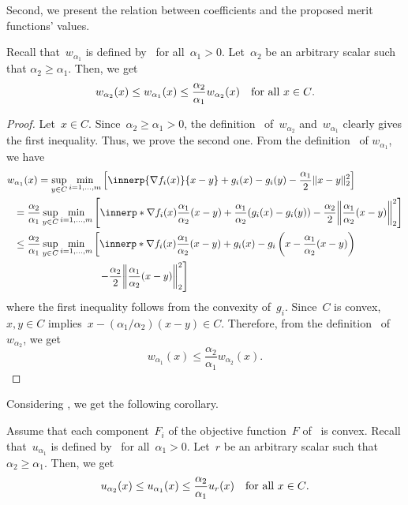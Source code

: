 \documentclass[../main]{subfiles}
\begin{document}
Second, we present the relation between coefficients and the proposed merit functions' values.
\begin{theorem} 
    Recall that~$w_{\alpha_1}$ is defined by~ for all~$\alpha_1 > 0$.
    Let~$\alpha_2$ be an arbitrary scalar such that $\alpha_2 \ge \alpha_1$.
    Then, we get
    \begin{equation}
        w_{\alpha_2}(x) \le w_{\alpha_1}(x) \le \frac{\alpha_2}{\alpha_1} w_{\alpha_2}(x) \quad \text{for all~$x \in C$}
    .\end{equation}
\end{theorem}
\begin{proof}
    Let~$x \in C$.
    Since~$\alpha_2 \ge \alpha_1 > 0$, the definition~ of~$w_{\alpha_2}$ and~$w_{\alpha_1}$ clearly gives the first inequality.
    Thus, we prove the second one.
    From the definition~ of $w_{\alpha_1}$, we have
\begin{align}
    \MoveEqLeft w_{\alpha_1}(x) = \sup_{y \in C} \min_{i = 1, \dots, m} \left[ \innerp{\nabla f_i(x)}{x - y} + g_i(x) - g_i(y) - \frac{\alpha_1}{2}\norm{x - y}_2^2 \right] \\
    ={}& \frac{\alpha_2}{\alpha_1} \sup_{y \in C} \min_{i = 1, \dots, m} \left[ \innerp*{\nabla f_i(x)}{ \frac{\alpha_1}{\alpha_2}(x - y) } + \frac{\alpha_1}{\alpha_2}(g_i(x) - g_i(y)) - \frac{\alpha_2}{2} \norm*{ \frac{\alpha_1}{\alpha_2} (x - y) }_2^2 \right] \\
    \le{}& \frac{\alpha_2}{\alpha_1} \sup_{y \in C} \min_{i = 1, \dots, m} \left[ \innerp*{\nabla f_i(x)}{ \frac{\alpha_1}{\alpha_2} (x - y) } + g_i(x) - g_i \left(x - \frac{\alpha_1}{\alpha_2}(x - y)\right) \right. \\
        &\hspace{7em} \left. - \frac{\alpha_2}{2}\norm*{\frac{\alpha_1}{\alpha_2}(x - y)}_2^2 \right]
\end{align}
where the first inequality follows from the convexity of~$g_i$.
Since~$C$ is convex, $x, y \in C$ implies~$x - (\alpha_1 / \alpha_2)(x - y) \in C$.
Therefore, from the definition~ of~$w_{\alpha_2}$, we get
\begin{equation}
    w_{\alpha_1}(x) \le \frac{\alpha_2}{\alpha_1} w_{\alpha_2}(x)
.\end{equation} 
\end{proof}

Considering , we get the following corollary.
\begin{corollary}
    Assume that each component~$F_i$ of the objective function~$F$ of~ is convex.
    Recall that~$u_{\alpha_1}$ is defined by~ for all~$\alpha_1 > 0$.
    Let~$r$ be an arbitrary scalar such that $\alpha_2 \ge \alpha_1$.
    Then, we get
    \begin{equation}
        u_{\alpha_2}(x) \le u_{\alpha_1}(x) \le \frac{\alpha_2}{\alpha_1} u_r(x) \quad \text{for all~$x \in C$}
    .\end{equation}
\end{corollary}
\end{document}
